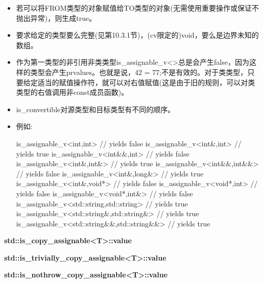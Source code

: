 \begin{itemize}
\item
若可以将FROM类型的对象赋值给TO类型的对象(无需使用重要操作或保证不抛出异常)，则生成true。

\item
要求给定的类型要么完整(见第10.3.1节)，(cv限定的)void，要么是边界未知的数组。

\item
作为第一类型的非引用非类类型is\_assignable\_v<>总是会产生false，因为这样的类型会产生prvalues。也就是说，42 = 77;不是有效的。对于类类型，只要给定适当的赋值操作符，就可以对右值赋值(这是由于旧的规则，可以对类类型的右值调用非const成员函数)。

\item
is\_convertible对源类型和目标类型有不同的顺序。

\item
例如:
\begin{cpp}
is_assignable_v<int,int> // yields false
is_assignable_v<int&,int> // yields true
is_assignable_v<int&&,int> // yields false
is_assignable_v<int&,int&> // yields true
is_assignable_v<int&&,int&&> // yields false
is_assignable_v<int&,long&> // yields true
is_assignable_v<int&,void*> // yields false
is_assignable_v<void*,int> // yields false
is_assignable_v<void*,int&> // yields false
is_assignable_v<std::string,std::string> // yields true
is_assignable_v<std::string&,std::string&> // yields true
is_assignable_v<std::string&&,std::string&&> // yields true
\end{cpp}
\end{itemize}

\textbf{std::is\_copy\_assignable<T>::value}

\textbf{std::is\_trivially\_copy\_assignable<T>::value}

\textbf{std::is\_nothrow\_copy\_assignable<T>::value}


